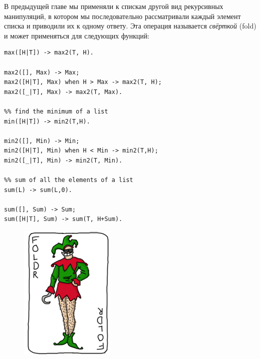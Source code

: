 \documentclass[a4paper,12pt]{report}
\begin{document}
В предыдущей главе мы применяли к спискам другой вид рекурсивных манипуляций, в котором мы последовательно рассматривали каждый элемент списка и приводили их к одному ответу. Эта операция называется \emph{свёрткой} (fold) и может применяться для следующих функций:
\begin{lstlisting}[style=erlang]
%% find the maximum of a list
max([H|T]) -> max2(T, H).
 
max2([], Max) -> Max;
max2([H|T], Max) when H > Max -> max2(T, H);
max2([_|T], Max) -> max2(T, Max).
 
%% find the minimum of a list
min([H|T]) -> min2(T,H).
 
min2([], Min) -> Min;
min2([H|T], Min) when H < Min -> min2(T,H);
min2([_|T], Min) -> min2(T, Min).
 
%% sum of all the elements of a list
sum(L) -> sum(L,0).
 
sum([], Sum) -> Sum;
sum([H|T], Sum) -> sum(T, H+Sum).
\end{lstlisting}
\begin{figure}
    \includegraphics[width=1\linewidth]{foldr.png}
\end{figure}
\end{document}
